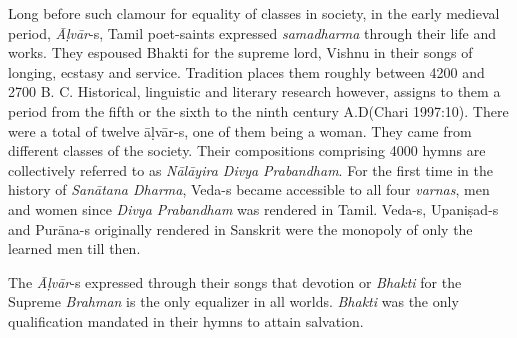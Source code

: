 Long before such clamour for equality of classes in society, in the early medieval period, \textit{Āḷvār}-s, Tamil poet-saints expressed \textit{samadharma} through their life and works. They espoused Bhakti for the supreme lord, Vishnu in their songs of longing, ecstasy and service. Tradition places them roughly between 4200 and 2700 B. C. Historical, linguistic and literary research however, assigns to them a period from the fifth or the sixth to the ninth century A.D(Chari 1997:10). There were a total of twelve āḷvār-s, one of them being a woman. They came from different classes of the society. Their compositions comprising 4000 hymns are collectively referred to as \textit{Nālāyira Divya Prabandham}. For the first time in the history of \textit{Sanātana Dharma}, Veda-s became accessible to all four \textit{varnas}, men and women since \textit{Divya Prabandham }was rendered in Tamil. Veda-s, Upaniṣad-s and Purāna-s originally rendered in Sanskrit were the monopoly of only the learned men till then.

The \textit{Āḷvār}-s expressed through their songs that devotion or\textit{ Bhakti} for the Supreme \textit{Brahman} is the only equalizer in all worlds. \textit{Bhakti }was the only qualification mandated in their hymns to attain salvation.

